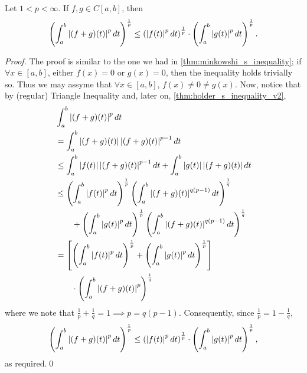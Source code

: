 \documentclass[notoc,notitlepage]{tufte-book}
\begin{document}
\begin{thm}\label{thm:minkowski_s_inequality_v2}
  Let $1 < p < \infty$. If $f, g \in C[a, b]$, then
  \begin{equation*}
    \left( \int_{a}^{b} \left|(f + g)(t)\right|^p \mathop{}\!d{t} \right)^\frac{1}{p} \leq \left( \left|f(t)\right|^p \mathop{}\!d{t} \right)^\frac{1}{p} \cdot \left( \int_{a}^{b} \left|g(t)\right|^p \mathop{}\!d{t} \right)^\frac{1}{p}.
  \end{equation*}
\end{thm}

\begin{proof}
  The proof is similar to the one we had in \cref{thm:minkowshi_s_inequality}; if $\forall x \in [a, b]$, either $f(x) = 0$ or $g(x) = 0$, then the inequality holds trivially so. Thus we may assyme that $\forall x \in [a, b]$, $f(x) \neq 0 \neq g(x)$. Now, notice that by (regular) Triangle Inequality and, later on, \cref{thm:holder_s_inequality_v2},
  \begin{align*}
    &\int_{a}^{b} \abs{(f + g)(t)}^p \dif{t} \\
    &= \int_{a}^{b} \abs{(f + g)(t)} \abs{(f + g)(t)}^{p - 1} \dif{t} \\
    &\leq \int_{a}^{b} \abs{f(t)} \abs{(f + g)(t)}^{p - 1} \dif{t} + \int_{a}^{b} \abs{g(t)} \abs{(f + g)(t)} \dif{t} \\
    &\leq \left( \int_{a}^{b} \abs{f(t)}^p \dif{t} \right)^\frac{1}{p} \left( \int_{a}^{b} \abs{(f + g)(t)}^{q (p - 1)} \dif{t} \right)^\frac{1}{q} \\
    &\qquad + \left( \int_{a}^{b} \abs{g(t)}^p \dif{t} \right)^\frac{1}{p} \left( \int_{a}^{b} \abs{(f + g)(t)}^{q (p - 1)} \dif{t} \right)^\frac{1}{q} \\
    &= \left[ \left( \int_{a}^{b} \abs{f(t)}^p \dif{t} \right)^\frac{1}{p} + \left( \int_{a}^{b} \abs{g(t)}^p \dif{t} \right)^\frac{1}{p} \right] \\
    &\qquad \cdot \left( \int_{a}^{b} \abs{(f + g)(t)}^{p} \right)^\frac{1}{q}
  \end{align*}
  where we note that $\frac{1}{p} + \frac{1}{q} = 1 \implies p = q(p - 1)$. Consequently, since $\frac{1}{p} = 1 - \frac{1}{q}$,
  \begin{equation*}
    \left( \int_{a}^{b} \left|(f + g)(t)\right|^p \mathop{}\!d{t} \right)^\frac{1}{p} \leq \left( \left|f(t)\right|^p \mathop{}\!d{t} \right)^\frac{1}{p} \cdot \left( \int_{a}^{b} \left|g(t)\right|^p \mathop{}\!d{t} \right)^\frac{1}{p},
  \end{equation*}
  as required.\qed
\end{proof}
\end{document}
